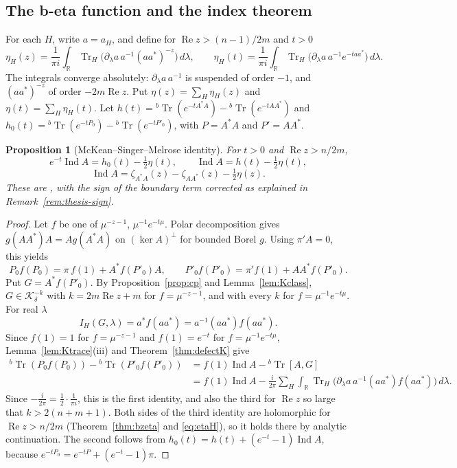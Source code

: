 \documentclass[11pt,oneside,reqno]{article}
\DeclareMathOperator{\Tr}{Tr}
\theoremstyle{plain}
\newtheorem{proposition}[theorem]{Proposition}
\theoremstyle{definition}
\theoremstyle{remark}
\begin{document}
\subsection{The b-eta function and the index theorem}\label{subsec:indexthm}

For each \(H\), write \(a=a_H\), and define for
\(\operatorname{Re}z>(n-1)/2m\) and \(t>0\)
\begin{equation}\label{eq:etaH}
 \eta_H(z)=\frac1{\pi i}\int_{\mathbb R}\Tr_H\bigl(\partial_\lambda a\,
 a^{-1}(aa^*)^{-z}\bigr)\,d\lambda,\qquad
 \eta_H(t)=\frac1{\pi i}\int_{\mathbb R}\Tr_H\bigl(\partial_\lambda a\,
 a^{-1}e^{-taa^*}\bigr)\,d\lambda .
\end{equation}
The integrals converge absolutely: \(\partial_\lambda a\,a^{-1}\) is
suspended of order \(-1\), and \((aa^*)^{-z}\) of order \(-2m\operatorname{Re}z\).
Put \(\eta(z)=\sum_H\eta_H(z)\) and \(\eta(t)=\sum_H\eta_H(t)\). Let
\(h(t)={}^b\Tr(e^{-tA^*A})-{}^b\Tr(e^{-tAA^*})\) and
\(h_0(t)={}^b\Tr(e^{-tP_0})-{}^b\Tr(e^{-tP'_0})\), with
\(P=A^*A\) and \(P'=AA^*\).

\begin{proposition}[McKean--Singer--Melrose identity]\label{prop:MS}
For \(t>0\) and \(\operatorname{Re}z>n/2m\),
\[
 e^{-t}\operatorname{Ind}A=h_0(t)-\tfrac12\eta(t),\qquad
 \operatorname{Ind}A=h(t)-\tfrac12\eta(t),
\]
\[
 \operatorname{Ind}A=\zeta_{A^*A}(z)-\zeta_{AA^*}(z)-\tfrac12\eta(z).
\]
These are \cite[Lemma~7.3, Lemma~8.3 and (89)]{LoyaThesis}, with the sign
of the boundary term corrected as explained in Remark~\ref{rem:thesis-sign}.
\end{proposition}

\begin{proof}
Let \(f\) be one of \(\mu^{-z-1}\), \(\mu^{-1}e^{-t\mu}\). Polar decomposition
gives \(g(AA^*)A=Ag(A^*A)\) on \((\ker A)^\perp\) for bounded Borel \(g\). Using
\(\pi'A=0\), this yields
\[
 P_0f(P_0)=\pi\,f(1)+A^*f(P'_0)A,\qquad
 P'_0f(P'_0)=\pi'f(1)+AA^*f(P'_0).
\]
Put \(G=A^*f(P'_0)\). By Proposition~\ref{prop:cp} and
Lemma~\ref{lem:Kclass}, \(G\in\mathcal K^{-k}_\delta\) with
\(k=2m\operatorname{Re}z+m\) for \(f=\mu^{-z-1}\), and with every \(k\) for
\(f=\mu^{-1}e^{-t\mu}\). For real \(\lambda\)
\[
 I_H(G,\lambda)=a^*f(aa^*)=a^{-1}(aa^*)f(aa^*).
\]
Since \(f(1)=1\) for \(f=\mu^{-z-1}\) and \(f(1)=e^{-t}\) for
\(f=\mu^{-1}e^{-t\mu}\), Lemma~\ref{lem:Ktrace}(iii) and
Theorem~\ref{thm:defectK} give
\begin{align*}
 {}^b\Tr(P_0f(P_0))-{}^b\Tr(P'_0f(P'_0))&=f(1)\operatorname{Ind}A
 -{}^b\Tr[A,G]\\
 &=f(1)\operatorname{Ind}A-\frac{i}{2\pi}\sum_H\int_{\mathbb R}
 \Tr_H\bigl(\partial_\lambda a\,a^{-1}(aa^*)f(aa^*)\bigr)\,d\lambda .
\end{align*}
Since \(-\frac{i}{2\pi}=\frac12\cdot\frac1{\pi i}\), this is the first
identity, and also the third for \(\operatorname{Re}z\) so large that
\(k>2(n+m+1)\). Both sides of the third identity are holomorphic for
\(\operatorname{Re}z>n/2m\) (Theorem~\ref{thm:bzeta} and \eqref{eq:etaH}), so
it holds there by analytic continuation. The second follows from \(h_0(t)=h(t)+(e^{-t}-1)
\operatorname{Ind}A\), because \(e^{-tP_0}=e^{-tP}+(e^{-t}-1)\pi\).
\end{proof}
\end{document}
